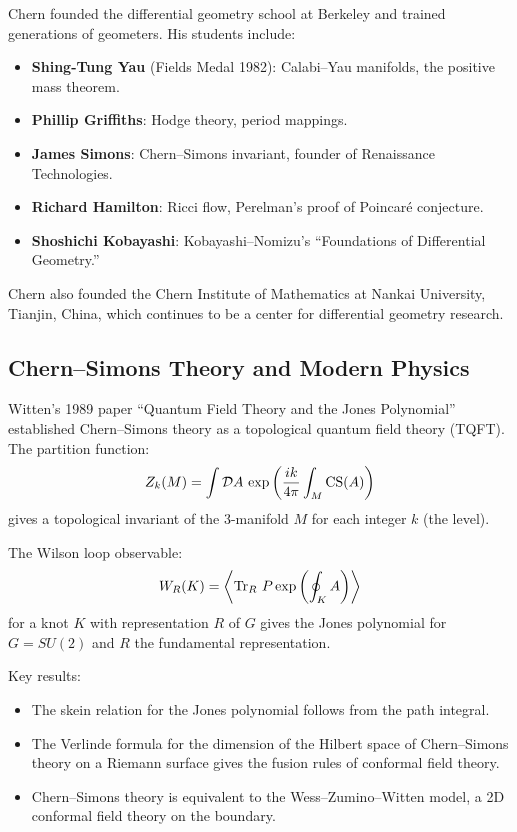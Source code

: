 Chern founded the differential geometry school at Berkeley and trained generations of geometers. His students include:
\begin{itemize}
    \item \textbf{Shing-Tung Yau} (Fields Medal 1982): Calabi--Yau manifolds, the positive mass theorem.
    \item \textbf{Phillip Griffiths}: Hodge theory, period mappings.
    \item \textbf{James Simons}: Chern--Simons invariant, founder of Renaissance Technologies.
    \item \textbf{Richard Hamilton}: Ricci flow, Perelman's proof of Poincar\'{e} conjecture.
    \item \textbf{Shoshichi Kobayashi}: Kobayashi--Nomizu's ``Foundations of Differential Geometry.''
\end{itemize}

Chern also founded the Chern Institute of Mathematics at Nankai University, Tianjin, China, which continues to be a center for differential geometry research.

\subsection{Chern--Simons Theory and Modern Physics}

Witten's 1989 paper ``Quantum Field Theory and the Jones Polynomial'' established Chern--Simons theory as a topological quantum field theory (TQFT). The partition function:
\[
Z_k(M) = \int \mathcal{D}A \, \exp\left( \frac{ik}{4\pi} \int_M \operatorname{CS}(A) \right)
\]
gives a topological invariant of the 3-manifold $M$ for each integer $k$ (the level).

The Wilson loop observable:
\[
W_R(K) = \left\langle \Tr_R \, P \exp\left( \oint_K A \right) \right\rangle
\]
for a knot $K$ with representation $R$ of $G$ gives the Jones polynomial for $G = SU(2)$ and $R$ the fundamental representation.

Key results:
\begin{itemize}
    \item The skein relation for the Jones polynomial follows from the path integral.
    \item The Verlinde formula for the dimension of the Hilbert space of Chern--Simons theory on a Riemann surface gives the fusion rules of conformal field theory.
    \item Chern--Simons theory is equivalent to the Wess--Zumino--Witten model, a 2D conformal field theory on the boundary.
\end{itemize}

